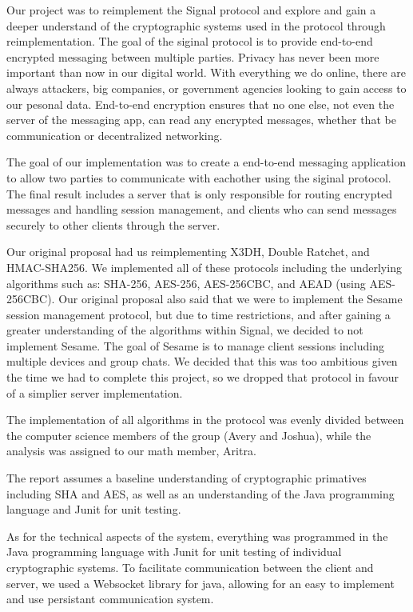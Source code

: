 Our project was to reimplement the Signal protocol and explore and gain a deeper understand of 
the cryptographic systems used in the protocol through reimplementation. The goal of the siginal protocol 
is to provide end-to-end encrypted messaging between multiple parties. Privacy has 
never been more important than now in our digital world. With everything we do online, 
there are always attackers, big companies, or government agencies looking to gain access to our pesonal
data. End-to-end encryption ensures that no one else, not even the server of the messaging app, can read 
any encrypted messages, whether that be communication or decentralized networking.

The goal of our implementation was to create a end-to-end messaging application to allow two parties 
to communicate with eachother using the siginal protocol. The final result includes a server that is only
responsible for routing encrypted messages and handling session management, and clients who can send messages
securely to other clients through the server.

Our original proposal had us reimplementing X3DH, Double Ratchet, and HMAC-SHA256. We implemented all of these protocols
including the underlying algorithms such as: SHA-256, AES-256, AES-256CBC, and AEAD (using AES-256CBC). 
Our original proposal also said that we were to implement the Sesame session management protocol, but due to time restrictions,
and after gaining a greater understanding of the algorithms within Signal, we decided to not implement Sesame.
The goal of Sesame is to manage client sessions including multiple devices and group chats. We decided that this was too ambitious 
given the time we had to complete this project, so we dropped that protocol in favour of a simplier server implementation.

The implementation of all algorithms in the protocol was evenly divided between the computer science members of the group (Avery and Joshua),
while the analysis was assigned to our math member, Aritra.

The report assumes a baseline understanding of cryptographic primatives including SHA and AES, as well as an understanding 
of the Java programming language and Junit for unit testing.

As for the technical aspects of the system, everything was programmed in the Java programming language with Junit for unit testing of 
individual cryptographic systems. To facilitate communication between the client and server, we used a Websocket library for java,
allowing for an easy to implement and use persistant communication system.
